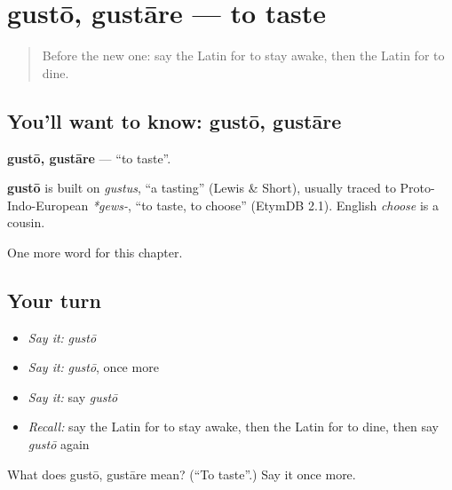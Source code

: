 \section[gustō, gustāre]{gustō, gustāre — to taste}

\label{lesson:LA-C158-gusto}



\begin{quote}
Before the new one: say the Latin for to stay awake, then the Latin for to dine.
\end{quote}

\subsection*{You'll want to know: gustō, gustāre}
\textbf{gustō, gustāre} — \textquotedblleft{}to taste\textquotedblright{}.

\begin{cousinweb}
\textbf{gustō} is built on \emph{gustus}, \textquotedblleft{}a tasting\textquotedblright{} (Lewis \& Short), usually traced to Proto-Indo-European \emph{*gews-}, \textquotedblleft{}to taste, to choose\textquotedblright{} (EtymDB 2.1). English \emph{choose} is a cousin.
\end{cousinweb}

\begin{grammarlens}[title={What you've built}]
One more word for this chapter.
\end{grammarlens}

\subsection*{Your turn}
\begin{itemize}
\raggedright
  \item \emph{Say it:} \emph{gustō}
  \item \emph{Say it:} \emph{gustō}, once more
  \item \emph{Say it:} say \emph{gustō}
  \item \emph{Recall:} say the Latin for to stay awake, then the Latin for to dine, then say \emph{gustō} again
\end{itemize}

\begin{tcolorbox}[breakable,colback=teal!4,colframe=teal!35!black,title={Before you move on}]
What does gustō, gustāre mean? (\textquotedblleft{}To taste\textquotedblright{}.) Say it once more.
\end{tcolorbox}
